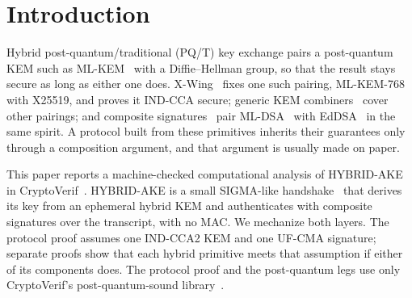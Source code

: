 \section{Introduction}\label{sec:intro}

Hybrid post-quantum/traditional (PQ/T) key exchange pairs a post-quantum KEM
such as ML-KEM~\cite{FIPS203} with a Diffie--Hellman group, so that the
result stays secure as long as either one does. X-Wing~\cite{XWing,XWingDraft}
fixes one such pairing, ML-KEM-768 with X25519, and proves it IND-CCA secure;
generic KEM combiners~\cite{GHP18,BBFGS19} cover other pairings; and composite
signatures~\cite{Composite} pair ML-DSA~\cite{FIPS204} with EdDSA~\cite{RFC8032}
in the same spirit. A protocol built from these primitives inherits their
guarantees only through a composition argument, and that argument is usually
made on paper.

This paper reports a machine-checked computational analysis of HYBRID-AKE
in CryptoVerif~\cite{Bla08,CryptoVerif}. HYBRID-AKE is a small SIGMA-like
handshake~\cite{Kra03} that derives its key from an ephemeral hybrid KEM and
authenticates with composite signatures over the transcript, with no MAC. We
mechanize both layers. The protocol proof assumes one IND-CCA2 KEM and one
UF-CMA signature; separate proofs show that each hybrid primitive meets that
assumption if either of its components does. The protocol proof and the
post-quantum legs use only CryptoVerif's post-quantum-sound
library~\cite{BJ24}.

